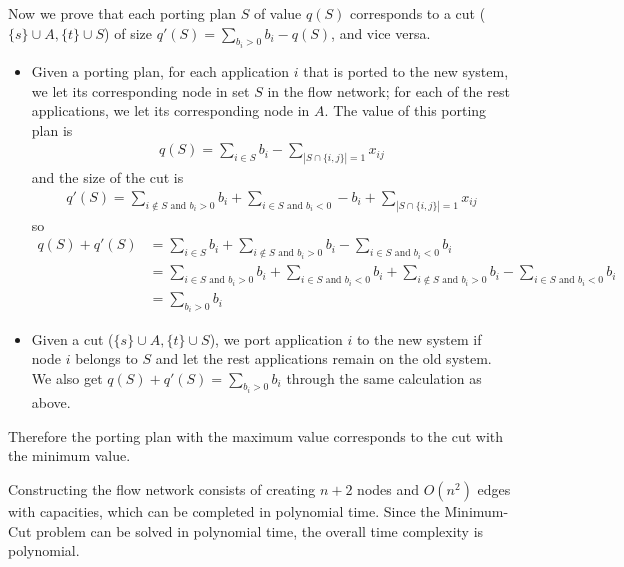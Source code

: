 \documentclass[12pt,letterpaper]{article}
\begin{document}
Now we prove that each porting plan $S$ of value $q(S)$ corresponds to a cut ($\{s\}\cup A, \{t\}\cup S$) of size $q'(S)=\sum_{b_i>0} b_i-q(S)$, and vice versa.
\begin{itemize}
\item Given a porting plan, for each application $i$ that is ported to the new system, we let its corresponding node in set $S$ in the flow network; for each of the rest applications, we let its corresponding node in $A$. The value of this porting plan is 
\begin{align}
q(S)=\sum_{i\in S}b_i-\sum_{|S\cap \{i,j\}|=1}x_{ij}
\end{align}
and the size of the cut is 
\begin{align}
q'(S)=\sum_{i\notin S\textrm{ and }b_i>0}b_i+\sum_{i\in S\textrm{ and }b_i<0}-b_i+\sum_{|S\cap \{i,j\}|=1}x_{ij}
\end{align}
so 
\begin{align}
\nonumber q(S)+q'(S) & = \sum_{i\in S}b_i+\sum_{i\notin S\textrm{ and }b_i>0}b_i-\sum_{i\in S\textrm{ and }b_i<0}b_i\\\nonumber
& = \sum_{i\in S\textrm{ and }b_i>0}b_i+\sum_{i\in S\textrm{ and }b_i<0}b_i+\sum_{i\notin S\textrm{ and }b_i>0}b_i-\sum_{i\in S\textrm{ and }b_i<0}b_i\\\nonumber
& = \sum_{b_i>0}b_i
\end{align}
\item Given a cut ($\{s\}\cup A, \{t\}\cup S$), we port application $i$ to the new system if node $i$ belongs to $S$ and let the rest applications remain on the old system. We also get $q(S)+q'(S)=\sum_{b_i>0} b_i$ through the same calculation as above.
\end{itemize}
Therefore the porting plan with the maximum value corresponds to the cut with the minimum value.

Constructing the flow network consists of creating $n+2$ nodes and $O(n^2)$ edges with capacities, which can be completed in polynomial time. Since the Minimum-Cut problem can be solved in polynomial time, the overall time complexity is polynomial.
\end{document}
